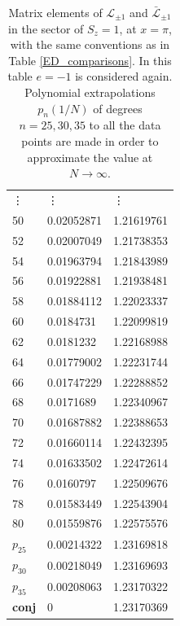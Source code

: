 \documentclass[a4paper,10pt]{article}
\newcommand{\jesper}[1]{$\framebox{\tiny J}$\ \textbf{\texttt{{\color{cyan}\footnotesize#1}}}}
\newcommand{\KSgen}{\mathcal{L}}
\begin{document}
\begin{table}[H]
\begin{minipage}{0.5\textwidth}
\begin{tabular}{lll}
\hline
\vdots & \vdots & \vdots  \\ 
 50   & 0.02052871 & 1.21619761 \\
 52   & 0.02007049 & 1.21738353 \\
 54   & 0.01963794 & 1.21843989 \\
 56   & 0.01922881 & 1.21938481 \\
 58   & 0.01884112 & 1.22023337 \\
 60   & 0.0184731  & 1.22099819 \\
 62   & 0.0181232  & 1.22168988 \\
 64   & 0.01779002 & 1.22231744 \\
 66   & 0.01747229 & 1.22288852 \\
 68   & 0.0171689  & 1.22340967 \\
 70   & 0.01687882 & 1.22388653 \\
 72   & 0.01660114 & 1.22432395 \\
 74   & 0.01633502 & 1.22472614 \\
 76   & 0.0160797  & 1.22509676 \\
 78   & 0.01583449 & 1.22543904 \\
 80   & 0.01559876 & 1.22575576 \\
 $p_{25}$ & 0.00214322 & 1.23169818 \\
 $p_{30}$ & 0.00218049 & 1.23169693 \\
 $p_{35}$ & 0.00208063 & 1.23170322 \\
 \bf{conj }& 0       & 1.23170369 \\
\end{tabular}
\end{minipage} \hfill
\caption{Matrix elements of $\KSgen_{\pm 1}$ and $\bar{\KSgen}_{\pm 1}$ in the sector of $S_z=1$, at $x=\pi$, with the same conventions as in Table \ref{ED_comparisons}. In this table $e=-1$ is considered again. Polynomial extrapolations 
 $p_n(1/N)$ of degrees $n= 25, 30, 35$ to all the data points are made in order to approximate the value at $N \rightarrow \infty$. 
%
}\label{level1}
\end{table}
\end{document}
